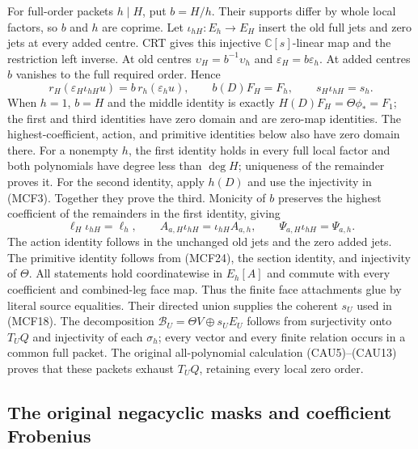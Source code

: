 For full-order packets $h\mid H$, put $b=H/h$.  Their supports differ by
whole local factors, so $b$ and $h$ are coprime.  Let
$\iota_{hH}:E_h\to E_H$ insert the old full jets and zero jets at every
added centre.  CRT gives this injective $\mathbb C[s]$-linear map and
the restriction left inverse.  At old centres $\upsilon_H=b^{-1}\upsilon_h$
and $\varepsilon_H=b\varepsilon_h$.  At added centres $b$ vanishes to
the full required order.  Hence
\[
r_H(\varepsilon_H\iota_{hH}u)=b\,r_h(\varepsilon_hu),\qquad
b(D)F_H=F_h,\qquad s_H\iota_{hH}=s_h.
\tag{MCF26}
\]
When $h=1$, $b=H$ and the middle identity is exactly
$H(D)F_H=\Theta\phi_*=F_1$; the first and third identities have
zero domain and are zero-map identities.  The highest-coefficient,
action, and primitive identities below also have zero domain there.
For a nonempty $h$, the first identity holds in every full local factor and both polynomials
have degree less than $\deg H$; uniqueness of the remainder proves it.
For the second identity, apply $h(D)$ and use the injectivity in (MCF3).
Together they prove the third.  Monicity of $b$ preserves the highest
coefficient of the remainders in the first identity, giving
\[
\ell_H\iota_{hH}=\ell_h,\qquad
A_{a,H}\iota_{hH}=\iota_{hH}A_{a,h},\qquad
\Psi_{a,H}\iota_{hH}=\Psi_{a,h}.
\tag{MCF27}
\]
The action identity follows in the unchanged old jets and the zero added
jets.  The primitive identity follows from (MCF24), the section identity,
and injectivity of $\Theta$.  All statements hold coordinatewise in
$E_h[A]$ and commute with every coefficient and combined-leg face map.
Thus the finite face attachments glue by literal source equalities.
Their directed union supplies the coherent $s_U$ used in (MCF18).
The decomposition $\mathscr B_U=\Theta V\oplus s_UE_U$ follows from
surjectivity onto $T_UQ$ and injectivity of each $\sigma_h$; every vector
and every finite relation occurs in a common full packet.  The original
all-polynomial calculation (CAU5)--(CAU13) proves that these packets
exhaust $T_UQ$, retaining every local zero order.

\subsection{The original negacyclic masks and coefficient Frobenius}

